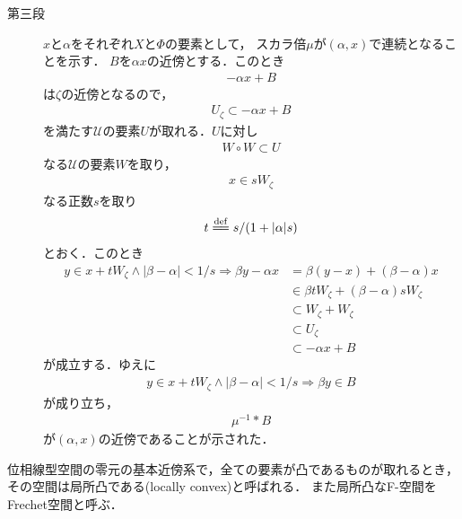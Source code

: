 \begin{sketch}
\begin{description}
			\item[第三段]
				$x$と$\alpha$をそれぞれ$X$と$\Phi$の要素として，
				スカラ倍$\mu$が$(\alpha,x)$で連続となることを示す．
				$B$を$\alpha x$の近傍とする．このとき
				\begin{align}
					-\alpha x + B
				\end{align}
				は$\zeta$の近傍となるので，
				\begin{align}
					U_\zeta \subset -\alpha x + B 
				\end{align}
				を満たす$\mathscr{U}$の要素$U$が取れる．$U$に対し
				\begin{align}
					W \circ W \subset U
				\end{align}
				なる$\mathscr{U}$の要素$W$を取り，
				\begin{align}
					x \in s W_\zeta
				\end{align}
				なる正数$s$を取り
				\begin{align}
					t \defeq s/(1+|\alpha|s)
				\end{align}
				とおく．このとき
				\begin{align}
					y \in x+t W_\zeta \wedge |\beta - \alpha| < 1/s
					\Longrightarrow \beta y - \alpha x
					&= \beta (y-x) + (\beta - \alpha)x \\
					&\in \beta t W_\zeta + (\beta - \alpha) s W_\zeta \\
					&\subset W_\zeta + W_\zeta \\
					&\subset U_\zeta \\
					&\subset -\alpha x + B
				\end{align}
				が成立する．ゆえに
				\begin{align}
					y \in x+t W_\zeta \wedge |\beta - \alpha| < 1/s
					\Longrightarrow \beta y \in B
				\end{align}
				が成り立ち，
				\begin{align}
					\mu^{-1} \ast B
				\end{align}
				が$(\alpha,x)$の近傍であることが示された．
				
		\end{description}
	\end{sketch}
	
	\begin{screen}
		\begin{dfn}
			位相線型空間の零元の基本近傍系で，全ての要素が凸であるものが取れるとき，
			その空間は局所凸である(locally convex)と呼ばれる．
			また局所凸なF-空間をFrechet空間と呼ぶ．
		\end{dfn}
	\end{screen}
	
